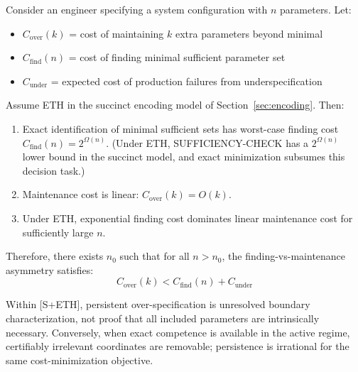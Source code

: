 \begin{theorem}
\label{thm:cost-asymmetry-eth}
Consider an engineer specifying a system configuration with $n$ parameters. Let:
\begin{itemize}
\item $C_{\text{over}}(k)$ = cost of maintaining $k$ extra parameters beyond minimal
\item $C_{\text{find}}(n)$ = cost of finding minimal sufficient parameter set
\item $C_{\text{under}}$ = expected cost of production failures from underspecification
\end{itemize}

Assume ETH in the succinct encoding model of Section~\ref{sec:encoding}. Then:
\begin{enumerate}
\item Exact identification of minimal sufficient sets has worst-case finding cost $C_{\text{find}}(n)=2^{\Omega(n)}$. (Under ETH, SUFFICIENCY-CHECK has a $2^{\Omega(n)}$ lower bound in the succinct model, and exact minimization subsumes this decision task.)
\item Maintenance cost is linear: $C_{\text{over}}(k) = O(k)$.
\item Under ETH, exponential finding cost dominates linear maintenance cost for sufficiently large $n$.
\end{enumerate}

Therefore, there exists $n_0$ such that for all $n > n_0$, the finding-vs-maintenance asymmetry satisfies:
\[
C_{\text{over}}(k) < C_{\text{find}}(n) + C_{\text{under}}
\]

Within [S+ETH], persistent over-specification is unresolved boundary characterization, not proof that all included parameters are intrinsically necessary. Conversely, when exact competence is available in the active regime, certifiably irrelevant coordinates are removable; persistence is irrational for the same cost-minimization objective.
\end{theorem}

